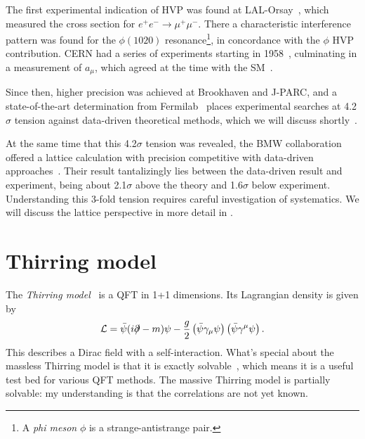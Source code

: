 The first experimental indication of HVP was found at 
LAL-Orsay~\cite{augustin_evidence_1973},
which measured the cross section for $e^+e^-\to\mu^+\mu^-$.
There a characteristic interference pattern was found for
the $\phi(1020)$ resonance\footnote{A {\it phi meson} $\phi$
is a strange-antistrange pair.}, in concordance with the
$\phi$ HVP contribution. CERN had a series of experiments
starting in 
1958~\cite{charpak_measurement_1961,bailey_precise_1971,bailey_anomalous_1977}, 
culminating in a measurement of $a_\mu$, which agreed at the time with the 
SM~\cite{calmet_anomalous_1977}.


Since then, higher precision was achieved at Brookhaven
and J-PARC, and a state-of-the-art determination from 
Fermilab~\cite{abi_measurement_2021}
places experimental searches at 4.2$\sigma$ tension
against data-driven theoretical methods,
which we will discuss shortly~\cite{aoyama_anomalous_2020}.


At the same time that this 4.2$\sigma$ tension was revealed,
the BMW collaboration offered a lattice calculation with precision competitive
with data-driven approaches~\cite{borsanyi_leading_2021}.
Their result tantalizingly lies between the data-driven result and experiment,
being about 2.1$\sigma$ above the theory and 1.6$\sigma$ below experiment.
Understanding this 3-fold tension requires careful investigation of
systematics. We will discuss the lattice perspective
in more detail in . 



\section{Thirring model}\label{sec:Thirring}

The {\it Thirring model}~\cite{thirring_soluble_1958} is a QFT in 1+1 dimensions.
Its Lagrangian density is given by
\begin{equation}
  \mathcal{L}=\bar{\psi}(i\partial\!\!\!/-m)\psi -\frac{g}{2}
         \left(\bar{\psi}\gamma_\mu\psi\right) \left(\bar{\psi}\gamma^\mu
\psi\right).
\end{equation}
This describes a Dirac field with a self-interaction.
What's special about the massless Thirring model is that it is 
exactly solvable~\cite{johnson_solution_1961,hagen_new_1967,klaiber_1968}, 
which means it is a useful test bed for various QFT methods.
The massive Thirring model is partially solvable: my understanding is that the
correlations are not yet known.

